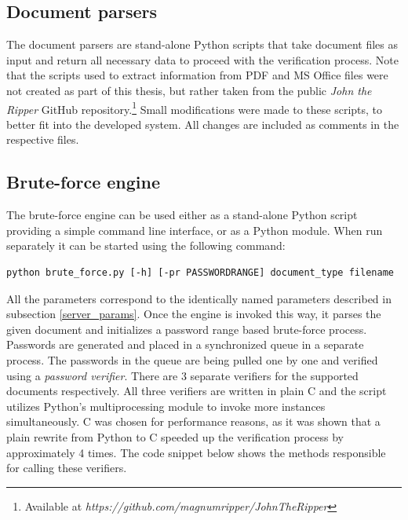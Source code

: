 \documentclass[11pt,oneside]{fithesis2}
\begin{document}
\subsection{Document parsers} \label{doc_parsers}

The document parsers are stand-alone Python scripts that take document files as input and return all necessary data to proceed with the verification process. Note that the scripts used to extract information from PDF and MS Office files were not created as part of this thesis, but rather taken from the public \textit{John the Ripper} GitHub repository.\footnote{Available at \textit{https://github.com/magnumripper/JohnTheRipper}} Small modifications were made to these scripts, to better fit into the developed system. All changes are included as comments in the respective files.

\subsection{Brute-force engine}\label{brute_force_engine}

The brute-force engine can be used either as a stand-alone Python script providing a simple command line interface, or as a Python module. When run separately it can be started using the following command:

\begin{lstlisting}
python brute_force.py [-h] [-pr PASSWORDRANGE] document_type filename
\end{lstlisting}

All the parameters correspond to the identically named parameters described in subsection \ref{server_params}. Once the engine is invoked this way, it parses the given document and initializes a password range based brute-force process. Passwords are generated and placed in a synchronized queue in a separate process. The passwords in the queue are being pulled one by one and verified using a \textit{password verifier}. There are 3 separate verifiers for the supported documents respectively. All three verifiers are written in plain C and the script utilizes Python's multiprocessing module to invoke more instances simultaneously. C was chosen for performance reasons, as it was shown that a plain rewrite from Python to C speeded up the verification process by approximately 4 times. The code snippet below shows the methods responsible for calling these verifiers.
\end{document}
